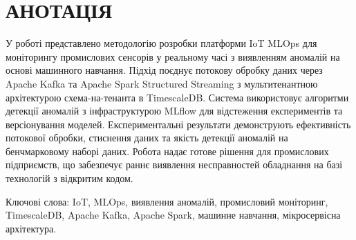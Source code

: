 \chapter*{АНОТАЦІЯ}

У роботі представлено методологію розробки платформи IoT MLOps для моніторингу промислових сенсорів у реальному часі з виявленням аномалій на основі машинного навчання. Підхід поєднує потокову обробку даних через Apache Kafka та Apache Spark Structured Streaming з мультитенантною архітектурою схема-на-тенанта в TimescaleDB. Система використовує алгоритми детекції аномалій з інфраструктурою MLflow для відстеження експериментів та версіонування моделей. Експериментальні результати демонструють ефективність потокової обробки, стиснення даних та якість детекції аномалій на бенчмарковому наборі даних. Робота надає готове рішення для промислових підприємств, що забезпечує раннє виявлення несправностей обладнання на базі технологій з відкритим кодом.

Ключові слова: IoT, MLOps, виявлення аномалій, промисловий моніторинг, TimescaleDB, Apache Kafka, Apache Spark, машинне навчання, мікросервісна архітектура.
